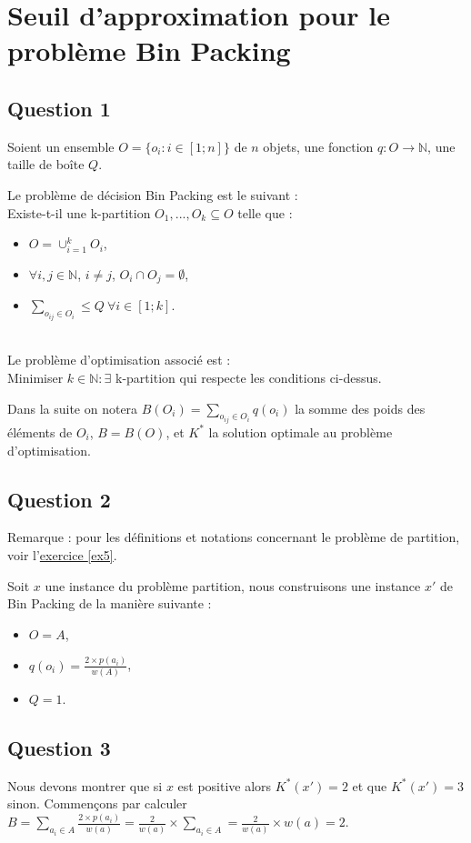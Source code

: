 \section{Seuil d'approximation pour le problème Bin Packing}\label{ex10}

\subsection{Question 1}\label{ex10_q1}
Soient un ensemble $O = \{o_i : i \in [1;n]\}$ de $n$ objets, une fonction $q : O \rightarrow \mathbb{N}$, une taille de boîte $Q$.

Le problème de décision Bin Packing est le suivant :\\
Existe-t-il une k-partition $O_1,...,O_k \subseteq O$ telle que :
\begin{itemize}
	\item $O = \cup_{i = 1}^{k}O_i$,
	\item $\forall i,j \in \mathbb{N}$, $i \neq j$, $O_i \cap O_j = \emptyset$,
	\item $\sum_{o_{ij} \in O_i} \leq Q\ \forall i \in [1;k]$.
\end{itemize}
~\\
Le problème d'optimisation associé est :\\
Minimiser $k \in \mathbb{N} : \exists$ k-partition qui respecte les conditions ci-dessus.

Dans la suite on notera $B(O_i) = \sum\limits_{o_{ij} \in O_i}q(o_i)$ la somme des poids des
éléments de $O_i$, $B = B(O)$, et $K^*$ la solution optimale au problème d'optimisation.

\subsection{Question 2}\label{ex10_q2}
Remarque : pour les définitions et notations concernant le problème de partition, voir
l'\href{ex5}{exercice \ref{ex5}}.

Soit $x$ une instance du problème partition, nous construisons
une instance $x'$ de Bin Packing de la manière suivante :
\begin{itemize}
	\item $O = A$,
	\item $q(o_i) = \frac{2 \times p(a_i)}{w(A)}$,
	\item $Q = 1$.
\end{itemize}


\subsection{Question 3}\label{ex10_q3}
Nous devons montrer que si $x$ est positive alors $K^*(x') = 2$ et que $K^*(x') = 3$
sinon.
Commençons par calculer $B = \sum_{a_i \in A} \frac{2 \times p(a_i)}{w(a)} =
\frac{2}{w(a)} \times \sum_{a_{i} \in A} = \frac{2}{w(a)} \times w(a) = 2$.

